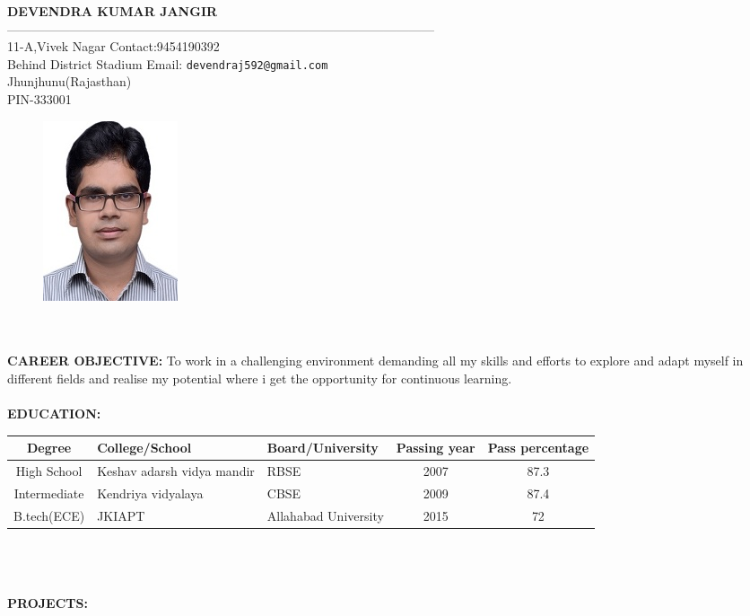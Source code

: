 \documentclass[10pt]{report}
\begin{document}
\qquad \qquad \textbf{DEVENDRA KUMAR JANGIR} \\
------------------------------------------------------------------------------------------------------\\
11-A,Vivek Nagar \quad\quad\qquad\qquad\qquad\qquad\qquad Contact:\mbox{9454190392} \\ 
Behind District Stadium \quad\qquad\qquad\qquad\qquad Email: \texttt{devendraj592@gmail.com} \\
Jhunjhunu(Rajasthan)   \\
PIN-333001    \\
\begin{figure}[h]
\qquad\qquad\qquad\qquad\qquad\qquad\qquad\qquad\qquad\qquad\qquad\qquad
\includegraphics{Dev.jpg}
\end{figure}  \\ \\
\textbf{CAREER OBJECTIVE:} To work in a challenging environment demanding all my skills and efforts to explore and adapt myself in different fields and realise my potential where i get the opportunity for continuous learning. \\ \\
\textbf{EDUCATION:}  \\
    \begin{tabular}{|c|p{2cm}|p{2.5cm}|c|c|}
    \hline
    Degree & College/School & Board/University & Passing year & Pass percentage  \\
    \hline
    High School & Keshav adarsh vidya mandir & RBSE & 2007 & 87.3 \\
    \hline
    Intermediate & Kendriya vidyalaya & CBSE & 2009 & 87.4  \\
    \hline
    B.tech(ECE) & JKIAPT & Allahabad University & 2015 & 72   \\
    \hline
    \end{tabular}   \\ \\ \\
\textbf{PROJECTS:}
\end{document}

